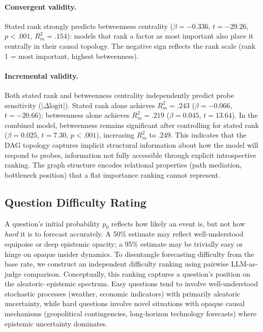 \documentclass[11pt]{article}
\begin{document}
\paragraph{Convergent validity.} Stated rank strongly predicts betweenness centrality ($\beta = -0.336$, $t = -29.26$, $p < .001$, $R^2_m = .154$): models that rank a factor as most important also place it centrally in their causal topology. The negative sign reflects the rank scale (rank 1 = most important, highest betweenness).

\paragraph{Incremental validity.} Both stated rank and betweenness centrality independently predict probe sensitivity ($|\Delta\text{logit}|$). Stated rank alone achieves $R^2_m = .243$ ($\beta = -0.066$, $t = -20.66$); betweenness alone achieves $R^2_m = .219$ ($\beta = 0.045$, $t = 13.64$). In the combined model, betweenness remains significant after controlling for stated rank ($\beta = 0.025$, $t = 7.30$, $p < .001$), increasing $R^2_m$ to $.249$. This indicates that the DAG topology captures implicit structural information about how the model will respond to probes, information not fully accessible through explicit introspective ranking. The graph structure encodes relational properties (path mediation, bottleneck position) that a flat importance ranking cannot represent.


\subsection{Question Difficulty Rating}
\label{app:difficulty}

A question's initial probability $p_0$ reflects how likely an event is, but not how \emph{hard} it is to forecast accurately.
A 50\% estimate may reflect well-understood equipoise or deep epistemic opacity; a 95\% estimate may be trivially easy or hinge on opaque insider dynamics.
To disentangle forecasting difficulty from the base rate, we construct an independent difficulty ranking using pairwise LLM-as-judge comparison.
Conceptually, this ranking captures a question's position on the aleatoric--epistemic spectrum. Easy questions tend to involve well-understood stochastic processes (weather, economic indicators) with primarily aleatoric uncertainty, while hard questions involve novel situations with opaque causal mechanisms (geopolitical contingencies, long-horizon technology forecasts) where epistemic uncertainty dominates.
\end{document}
